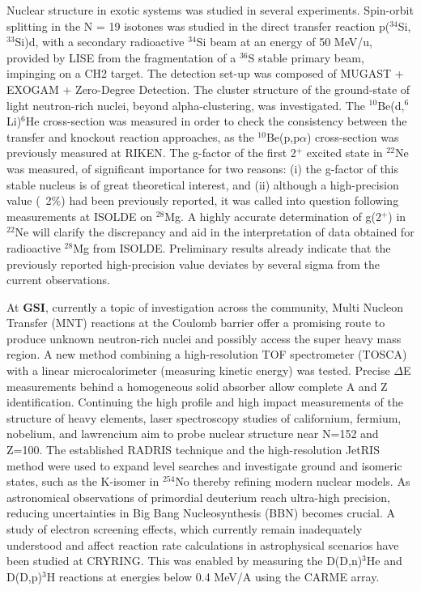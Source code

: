 Nuclear structure in exotic systems was studied in several experiments. Spin-orbit splitting in the N = 19 isotones was studied in 
the direct transfer reaction p($^{34}$Si,$^{33}$Si)d, with a secondary radioactive $^{34}$Si beam at an energy of 50 MeV/u, provided by LISE from the fragmentation of a $^{36}$S stable primary beam, impinging on a CH2 target. The detection set-up was composed of MUGAST + EXOGAM + Zero-Degree Detection. The cluster structure of the ground-state of light neutron-rich nuclei, beyond alpha-clustering, was investigated. The $^{10}$Be(d,$^6$Li)$^6$He cross-section was measured in order to check the consistency between the transfer and knockout reaction approaches, as the $^{10}$Be(p,p$\alpha$) cross-section was previously measured at RIKEN.   The g-factor of the first 2$^+$ excited state in $^{22}$Ne was measured, of significant importance for two reasons: (i) the g-factor of this stable nucleus is of great theoretical interest, and (ii) although a high-precision value (~2$\%$) had been previously reported, it was called into question following measurements at ISOLDE on $^{28}$Mg. A highly accurate determination of g(2$^+$) in $^{22}$Ne will clarify the discrepancy and aid in the interpretation of data obtained for radioactive $^{28}$Mg from ISOLDE. Preliminary results already indicate that the previously reported high-precision value deviates by several sigma from the current observations.

At \textbf{GSI}, currently a topic of investigation across the community, Multi Nucleon Transfer (MNT) reactions at the Coulomb barrier offer a promising route to produce unknown neutron-rich nuclei and possibly access the super heavy mass region. A new method combining a high-resolution TOF spectrometer (TOSCA) with a linear microcalorimeter (measuring kinetic energy) was tested. Precise $\Delta$E measurements behind a homogeneous solid absorber allow complete A and Z identification. Continuing the high profile and high impact measurements of the structure of heavy elements, laser spectroscopy studies of californium, fermium, nobelium, and lawrencium %
aim
to probe nuclear structure near N=152 and Z=100. The established RADRIS technique and the high-resolution JetRIS method were used to expand level searches and investigate ground and isomeric states, such as the K-isomer in $^{254}$No thereby refining modern nuclear models. As astronomical observations of primordial deuterium reach ultra-high precision, reducing uncertainties in Big Bang Nucleosynthesis (BBN) becomes crucial. A study of electron screening effects, which currently remain inadequately understood and affect reaction rate calculations in astrophysical scenarios have been studied at CRYRING. This was enabled by measuring the D(D,n)$^3$He and D(D,p)$^3$H reactions at energies below 0.4 MeV/A using the CARME array.

